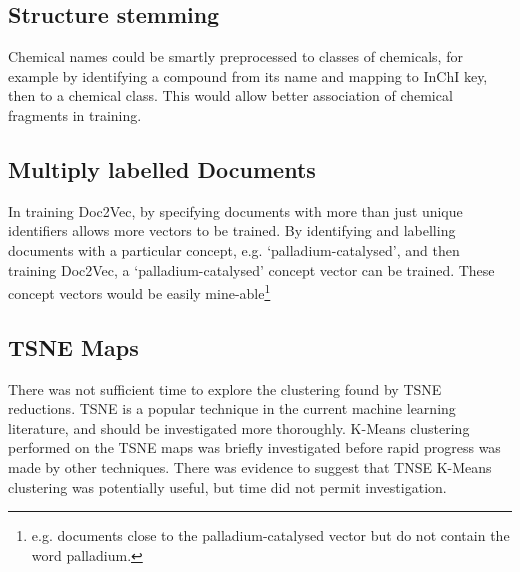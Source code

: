 \subsection{Structure stemming}
Chemical names could be smartly preprocessed to classes of chemicals, for example by identifying a compound from its name and mapping to InChI key, then to a chemical class. This would allow better association of chemical fragments in training.
\subsection{Multiply labelled Documents}
In training Doc2Vec, by specifying documents with more than just unique identifiers allows more vectors to be trained. By identifying and labelling documents with a particular concept, e.g. `palladium-catalysed', and then training Doc2Vec, a `palladium-catalysed' concept vector can be trained. These concept vectors would be easily mine-able\footnote{e.g. documents close to the palladium-catalysed vector but do not contain the word palladium.}
\subsection{TSNE Maps}
There was not sufficient time to explore the clustering found by TSNE reductions. TSNE is a popular technique in the current machine learning literature, and should be investigated more thoroughly. K-Means clustering performed on the TSNE maps was briefly investigated before rapid progress was made by other techniques. There was evidence to suggest that TNSE K-Means clustering was potentially useful, but time did not permit investigation.